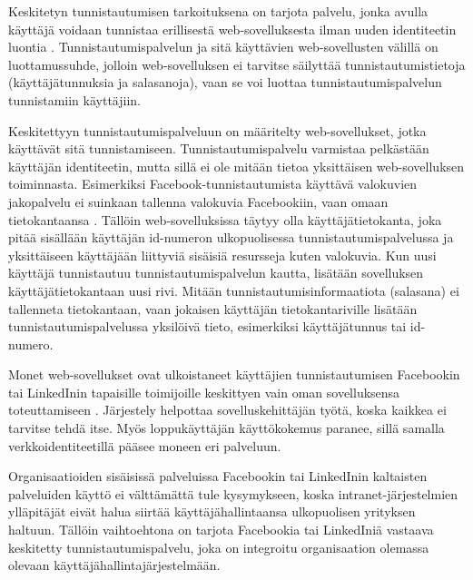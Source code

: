 Keskitetyn tunnistautumisen tarkoituksena on tarjota palvelu, jonka avulla käyttäjä voidaan tunnistaa erillisestä web-sovelluksesta ilman uuden identiteetin luontia \cite{facebook}. Tunnistautumispalvelun ja sitä käyttävien web-sovellusten välillä on luottamussuhde, jolloin web-sovelluksen ei tarvitse säilyttää tunnistautumistietoja (käyttäjätunnuksia ja salasanoja), vaan se voi luottaa tunnistautumispalvelun tunnistamiin käyttäjiin.

Keskitettyyn tunnistautumispalveluun on määritelty web-sovellukset, jotka käyttävät sitä tunnistamiseen. Tunnistautumispalvelu varmistaa pelkästään käyttäjän identiteetin, mutta sillä ei ole mitään tietoa yksittäisen web-sovelluksen toiminnasta. Esimerkiksi Facebook-tunnistautumista käyttävä valokuvien jakopalvelu ei suinkaan tallenna valokuvia Facebookiin, vaan omaan tietokantaansa \cite{web_resources}. Tällöin web-sovelluksissa täytyy olla käyttäjätietokanta, joka pitää sisällään käyttäjän id-numeron ulkopuolisessa tunnistautumispalvelussa ja yksittäiseen käyttäjään liittyviä sisäisiä resursseja kuten valokuvia. Kun uusi käyttäjä tunnistautuu tunnistautumispalvelun kautta, lisätään sovelluksen käyttäjätietokantaan uusi rivi. Mitään tunnistautumisinformaatiota (salasana) ei tallenneta tietokantaan, vaan jokaisen käyttäjän tietokantariville lisätään tunnistautumispalvelussa yksilöivä tieto, esimerkiksi käyttäjätunnus tai id-numero.

Monet web-sovellukset ovat ulkoistaneet käyttäjien tunnistautumisen Facebookin tai LinkedInin tapaisille toimijoille keskittyen vain oman sovelluksensa toteuttamiseen \cite{facebook}. Järjestely helpottaa sovelluskehittäjän työtä, koska kaikkea ei tarvitse tehdä itse. Myös loppukäyttäjän käyttökokemus paranee, sillä samalla verkkoidentiteetillä pääsee moneen eri palveluun.

Organisaatioiden sisäisissä palveluissa Facebookin tai LinkedInin kaltaisten palveluiden käyttö ei välttämättä tule kysymykseen, koska intranet-järjestelmien ylläpitäjät eivät halua siirtää käyttäjähallintaansa ulkopuolisen yrityksen haltuun. Tällöin vaihtoehtona on tarjota Facebookia tai LinkedIniä vastaava keskitetty tunnistautumispalvelu, joka on integroitu organisaation olemassa olevaan käyttäjähallintajärjestelmään.